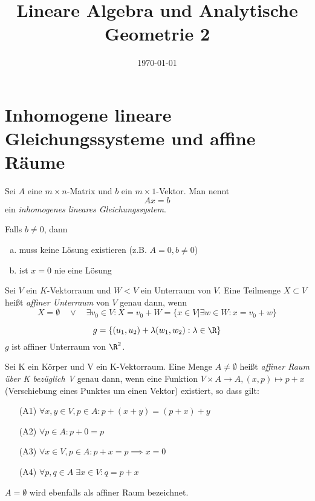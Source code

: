 \documentclass{mycourse}
\title{Lineare Algebra und Analytische Geometrie 2}
\author{}
\date{\today}
\begin{document}
\maketitle
\tableofcontents

\setcounter{section}{7}
\chapter{Inhomogene lineare Gleichungssysteme und affine Räume}

\begin{df} 
	\label{df: 8.1}
	Sei $A$ eine $m\times n$-Matrix und $b$ ein $m\times 1$-Vektor.
	Man nennt
	\[
		Ax = b
	\]
	ein \emph{inhomogenes lineares Gleichungssystem}.
	\begin{note}
		Falls $b\ne 0$, dann
		\begin{enumerate}[a)]
			\item muss keine Lösung existieren (z.B. $A=0, b\ne 0$)
			\item ist $x=0$ nie eine Lösung
		\end{enumerate}
	\end{note}
\end{df}

\begin{df} 
	\label{df: 8.2}
	Sei $V$ ein $K$-Vektorraum und $W<V$ ein Unterraum von $V$.
	Eine Teilmenge $X\subset V$ heißt \emph{affiner Unterraum} von $V$ genau dann, wenn
	\[
		X=\emptyset \quad \lor \quad \exists v_0\in V:X=v_0+W=\{x\in V | \exists w\in W:x=v_0+w\}
	\]
	\begin{ex}[Gerade im $\R^2$]
		\[ g=\{(u_1,u_2)+\lambda(w_1,w_2):\lambda\in\R\} \]
		$g$ ist affiner Unterraum von $\R^2$.
	\end{ex}
\end{df}

\begin{df} \label{df: 8.3}
Sei K ein Körper und V ein K-Vektorraum. Eine Menge $A \neq \emptyset$ heißt \textit{affiner Raum über K bezüglich V}
genau dann, wenn eine Funktion $V \times A \rightarrow A, (x,p) \mapsto p+x$ (Verschiebung eines Punktes um einen Vektor) existiert, so dass gilt:
\begin{enumerate}
\item[(A1)] \label{itm: aff1} $\forall x,y \in V, p \in A : p+(x+y)=(p+x)+y \qquad $
\item[(A2)] \label{itm: aff2} $\forall p \in A : p+0=p \qquad $
\item[(A3)] \label{itm: aff3} $\forall x \in V, p \in A: p+x=p \implies x = 0$
\item[(A4)] \label{itm: aff4} $\forall p, q \in A \;\exists x\in V : q=p+x$
\end{enumerate}
$A=\emptyset$ wird ebenfalls als affiner Raum bezeichnet.
\end{df}
\end{document}

